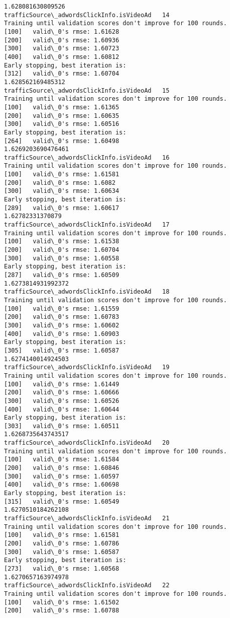 \documentclass[11pt]{article}
\begin{document}
\begin{Verbatim}[commandchars=\\\{\}]
1.628081630809526
trafficSource\_adwordsClickInfo.isVideoAd   14
Training until validation scores don't improve for 100 rounds.
[100]	valid\_0's rmse: 1.61628
[200]	valid\_0's rmse: 1.60936
[300]	valid\_0's rmse: 1.60723
[400]	valid\_0's rmse: 1.60812
Early stopping, best iteration is:
[312]	valid\_0's rmse: 1.60704
1.628562169485312
trafficSource\_adwordsClickInfo.isVideoAd   15
Training until validation scores don't improve for 100 rounds.
[100]	valid\_0's rmse: 1.61365
[200]	valid\_0's rmse: 1.60635
[300]	valid\_0's rmse: 1.60516
Early stopping, best iteration is:
[264]	valid\_0's rmse: 1.60498
1.6269203690476461
trafficSource\_adwordsClickInfo.isVideoAd   16
Training until validation scores don't improve for 100 rounds.
[100]	valid\_0's rmse: 1.61581
[200]	valid\_0's rmse: 1.6082
[300]	valid\_0's rmse: 1.60634
Early stopping, best iteration is:
[289]	valid\_0's rmse: 1.60617
1.62782331370879
trafficSource\_adwordsClickInfo.isVideoAd   17
Training until validation scores don't improve for 100 rounds.
[100]	valid\_0's rmse: 1.61538
[200]	valid\_0's rmse: 1.60704
[300]	valid\_0's rmse: 1.60558
Early stopping, best iteration is:
[287]	valid\_0's rmse: 1.60509
1.6273814931992372
trafficSource\_adwordsClickInfo.isVideoAd   18
Training until validation scores don't improve for 100 rounds.
[100]	valid\_0's rmse: 1.61559
[200]	valid\_0's rmse: 1.60783
[300]	valid\_0's rmse: 1.60602
[400]	valid\_0's rmse: 1.60903
Early stopping, best iteration is:
[305]	valid\_0's rmse: 1.60587
1.6274140014924503
trafficSource\_adwordsClickInfo.isVideoAd   19
Training until validation scores don't improve for 100 rounds.
[100]	valid\_0's rmse: 1.61449
[200]	valid\_0's rmse: 1.60666
[300]	valid\_0's rmse: 1.60526
[400]	valid\_0's rmse: 1.60644
Early stopping, best iteration is:
[303]	valid\_0's rmse: 1.60511
1.6268735643743517
trafficSource\_adwordsClickInfo.isVideoAd   20
Training until validation scores don't improve for 100 rounds.
[100]	valid\_0's rmse: 1.61584
[200]	valid\_0's rmse: 1.60846
[300]	valid\_0's rmse: 1.60597
[400]	valid\_0's rmse: 1.60698
Early stopping, best iteration is:
[315]	valid\_0's rmse: 1.60549
1.6270510184262108
trafficSource\_adwordsClickInfo.isVideoAd   21
Training until validation scores don't improve for 100 rounds.
[100]	valid\_0's rmse: 1.61581
[200]	valid\_0's rmse: 1.60786
[300]	valid\_0's rmse: 1.60587
Early stopping, best iteration is:
[273]	valid\_0's rmse: 1.60568
1.6270657163974978
trafficSource\_adwordsClickInfo.isVideoAd   22
Training until validation scores don't improve for 100 rounds.
[100]	valid\_0's rmse: 1.61502
[200]	valid\_0's rmse: 1.60788

\end{Verbatim}
\end{document}
